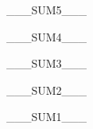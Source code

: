 
\vspace*{3em}

\begingroup
\cryptofont
\fontsize{7pt}{7pt}\selectfont
\noindent\hfill
___SUM5___\hfill\null
\par
\noindent\hfill
___SUM4___\hfill\null
\par
\noindent\hfill
___SUM3___\hfill\null
\par
\noindent\hfill
___SUM2___\hfill\null
\par
\noindent\hfill
___SUM1___\hfill\null
\par
\endgroup


